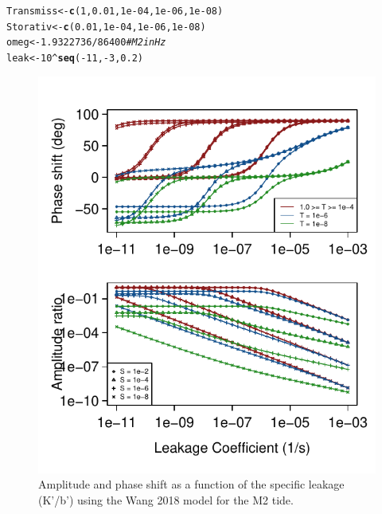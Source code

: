 \documentclass[12pt]{article}\usepackage[]{graphicx}\usepackage[]{color}
\makeatletter
\def\maxwidth{ %
  \ifdim\Gin@nat@width>\linewidth
    \linewidth
  \else
    \Gin@nat@width
  \fi
}
\newcommand{\hlnum}[1]{\textcolor[rgb]{0.686,0.059,0.569}{#1}}%
\newcommand{\hlcom}[1]{\textcolor[rgb]{0.678,0.584,0.686}{\textit{#1}}}%
\newcommand{\hlopt}[1]{\textcolor[rgb]{0,0,0}{#1}}%
\newcommand{\hlstd}[1]{\textcolor[rgb]{0.345,0.345,0.345}{#1}}%
\newcommand{\hlkwb}[1]{\textcolor[rgb]{0.69,0.353,0.396}{#1}}%
\newcommand{\hlkwd}[1]{\textcolor[rgb]{0.737,0.353,0.396}{\textbf{#1}}}%
\newenvironment{kframe}{%
 \def\at@end@of@kframe{}%
 \ifinner\ifhmode%
  \def\at@end@of@kframe{\end{minipage}}%
  \begin{minipage}{\columnwidth}%
 \fi\fi%
 \def\FrameCommand##1{\hskip\@totalleftmargin \hskip-\fboxsep
 \colorbox{shadecolor}{##1}\hskip-\fboxsep
     \hskip-\linewidth \hskip-\@totalleftmargin \hskip\columnwidth}%
 \MakeFramed {\advance\hsize-\width
   \@totalleftmargin\z@ \linewidth\hsize
   \@setminipage}}%
 {\par\unskip\endMakeFramed%
 \at@end@of@kframe}
\newenvironment{knitrout}{}{} %
\makeatother
\begin{document}
\begin{knitrout}\small
{}\color{fgcolor}\begin{kframe}
\begin{alltt}
\hlstd{Transmiss} \hlkwb{<-} \hlkwd{c}\hlstd{(}\hlnum{1}\hlstd{,} \hlnum{0.01}\hlstd{,} \hlnum{1e-04}\hlstd{,} \hlnum{1e-06}\hlstd{,} \hlnum{1e-08}\hlstd{)}
\hlstd{Storativ} \hlkwb{<-} \hlkwd{c}\hlstd{(}\hlnum{0.01}\hlstd{,} \hlnum{1e-04}\hlstd{,} \hlnum{1e-06}\hlstd{,} \hlnum{1e-08}\hlstd{)}
\hlstd{omeg} \hlkwb{<-} \hlnum{1.9322736}\hlopt{/}\hlnum{86400}  \hlcom{# M2 in Hz}
\hlstd{leak} \hlkwb{<-} \hlnum{10}\hlopt{^}\hlkwd{seq}\hlstd{(}\hlopt{-}\hlnum{11}\hlstd{,} \hlopt{-}\hlnum{3}\hlstd{,} \hlnum{0.2}\hlstd{)}
\end{alltt}
\end{kframe}
\end{knitrout}

\begin{figure}[htb!]
\begin{center}
\begin{knitrout}\small
{}\color{fgcolor}
\includegraphics[width=\maxwidth]{figure/WANGRESPFIG-1} 

\end{knitrout}
\caption{Amplitude and phase shift as a function of the specific leakage (K'/b') using the Wang 2018 model for the M2 tide.}
\label{fig:owrsp-wang}
\end{center}
\end{figure}
\end{document}

